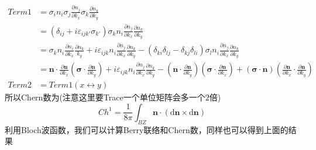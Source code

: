 \documentclass[a4paper]{article}
\numberwithin{equation}{subsection}
\begin{document}
\begin{equation}
    \begin{split}
        Term1&=\sigma_i n_i\sigma_j\frac{\partial n_j}{\partial k_x}\sigma_k\frac{\partial n_k}{\partial k_y}\\
        &=(\delta_{ij}+i\varepsilon_{ijk'}\sigma_{k'})\sigma_kn_i\frac{\partial n_j}{\partial k_x}\frac{\partial n_k}{\partial k_y}\\
        &=\sigma_k n_i\frac{\partial n_i}{\partial k_x}\frac{\partial n_k}{k_y}+i\varepsilon_{ijk}n_i\frac{\partial n_j}{\partial k_x}\frac{\partial n_k}{\partial k_y}-(\delta_{ki}\delta_{lj}-\delta_{kj}\delta_{li})\sigma_ln_i\frac{\partial n_j}{\partial k_x}\frac{\partial n_k}{\partial k_y}\\
        &=\mathbf{n}\cdot\frac{\partial\mathbf{n}}{\partial k_x}(\bm{\sigma}\cdot\frac{\partial\mathbf{n}}{\partial k_y})+i\varepsilon_{ijk}n_i\frac{\partial n_j}{\partial k_x}\frac{\partial n_k}{\partial k_y}-(\mathbf{n}\cdot\frac{\partial\mathbf{n}}{\partial k_y})(\bm{\sigma}\cdot\frac{\partial\mathbf{n}}{\partial k_x})+(\bm{\sigma}\cdot\mathbf{n})(\frac{\partial\mathbf{n}}{\partial k_x}\cdot\frac{\partial\mathbf{n}}{\partial k_y})\\
        Term2&=Term1(x\leftrightarrow y)
    \end{split}
\end{equation}
所以Chern数为(注意这里要Trace一个单位矩阵会多一个$2$倍)
\begin{equation}
    Ch^1=\frac{1}{8\pi}\int_{BZ}\mathbf{n}\cdot(\mathrm{d}\mathbf{n}\times\mathrm{d}\mathbf{n})
\end{equation}
利用Bloch波函数，我们可以计算Berry联络和Chern数，同样也可以得到上面的结果
\end{document}
